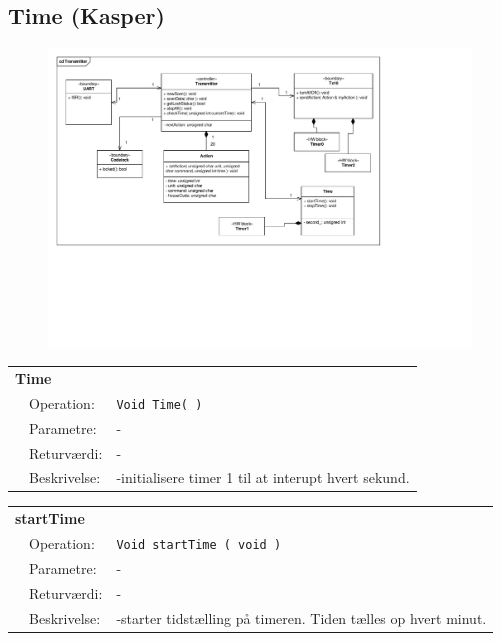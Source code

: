 \subsection{Time (Kasper)}

\begin{figure}[h]
\centering
\includegraphics[scale=1,clip=true, trim=503 213 195 250]{Systemarkitektur/diagrammer/Transmitter_KlasseDiagram} %
\end{figure}

\begin{table}[h]
\begin{tabularx}{\textwidth}{p{0.6 cm} l X} %
\multicolumn{3}{l}{\textbf{Time}}\\
& Operation: & %
\texttt{Void Time( )}
\\ & Parametre: & %
-
\\ & Returværdi: & %
- 
\\ & Beskrivelse: & %
-initialisere timer 1 til at interupt hvert sekund.
\\ \end{tabularx}
\end{table}

\clearpage

\begin{table}[h]
\begin{tabularx}{\textwidth}{p{0.6 cm} l X} %
\multicolumn{3}{l}{\textbf{startTime}}\\
& Operation: & %
\texttt{Void startTime ( void )}
\\ & Parametre: & %
-
\\ & Returværdi: & %
- 
\\ & Beskrivelse: & %
-starter tidstælling på timeren. Tiden tælles op hvert minut.
\\ \end{tabularx}
\end{table}

